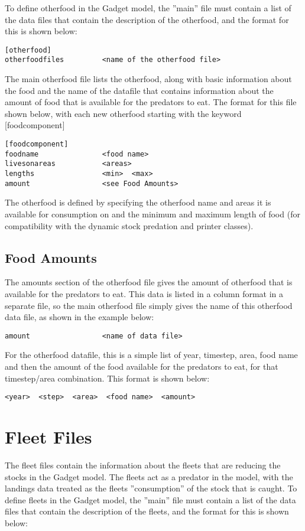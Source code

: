 \documentclass [a4paper, 10pt]{book}
\begin{document}
\bigskip
To define otherfood in the Gadget model, the ''main'' file must contain a list of the data files that contain the description of the otherfood, and the format for this is shown below:

\begin{verbatim}
[otherfood]
otherfoodfiles         <name of the otherfood file>
\end{verbatim}

The main otherfood file lists the otherfood, along with basic information about the food and the name of the datafile that contains information about the amount of food that is available for the predators to eat.  The format for this file shown below, with each new otherfood starting with the keyword [foodcomponent]

\begin{verbatim}
[foodcomponent]
foodname               <food name>
livesonareas           <areas>
lengths                <min>  <max>
amount                 <see Food Amounts>
\end{verbatim}

The otherfood is defined by specifying the otherfood name and areas it is available for consumption on and the minimum and maximum length of food (for compatibility with the dynamic stock predation and printer classes).

\section{Food Amounts}\label{sec:foodamounts}
The amounts section of the otherfood file gives the amount of otherfood that is available for the predators to eat.  This data is listed in a column format in a separate file, so the main otherfood file simply gives the name of this otherfood data file, as shown in the example below:

\begin{verbatim}
amount                 <name of data file>
\end{verbatim}

For the otherfood datafile, this is a simple list of year, timestep, area, food name and then the amount of the food available for the predators to eat, for that timestep/area combination.  This format is shown below:

\begin{verbatim}
<year>  <step>  <area>  <food name>  <amount>
\end{verbatim}

\chapter{Fleet Files}\label{chap:fleet}
The fleet files contain the information about the fleets that are reducing the stocks in the Gadget model.  The fleets act as a predator in the model, with the landings data treated as the fleets ''consumption'' of the stock that is caught.  To define fleets in the Gadget model, the ''main'' file must contain a list of the data files that contain the description of the fleets, and the format for this is shown below:
\end{document}
